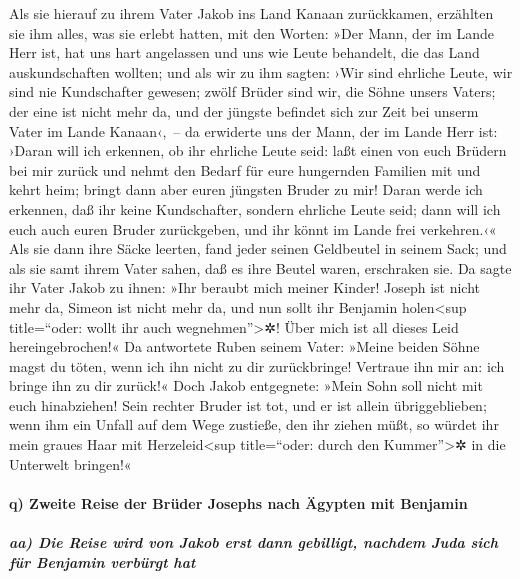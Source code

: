  Als sie hierauf zu ihrem Vater Jakob ins Land Kanaan
zurückkamen, erzählten sie ihm alles, was sie erlebt hatten, mit den
Worten:  »Der Mann, der im Lande Herr ist, hat uns hart
angelassen und uns wie Leute behandelt, die das Land auskundschaften
wollten;  und als wir zu ihm sagten: ›Wir sind ehrliche
Leute, wir sind nie Kundschafter gewesen;  zwölf Brüder
sind wir, die Söhne unsers Vaters; der eine ist nicht mehr da, und der
jüngste befindet sich zur Zeit bei unserm Vater im Lande Kanaan‹,~--
 da erwiderte uns der Mann, der im Lande Herr ist: ›Daran
will ich erkennen, ob ihr ehrliche Leute seid: laßt einen von euch
Brüdern bei mir zurück und nehmt den Bedarf für eure hungernden Familien
mit und kehrt heim;  bringt dann aber euren jüngsten
Bruder zu mir! Daran werde ich erkennen, daß ihr keine Kundschafter,
sondern ehrliche Leute seid; dann will ich euch auch euren Bruder
zurückgeben, und ihr könnt im Lande frei verkehren.‹« 
Als sie dann ihre Säcke leerten, fand jeder seinen Geldbeutel in seinem
Sack; und als sie samt ihrem Vater sahen, daß es ihre Beutel waren,
erschraken sie.  Da sagte ihr Vater Jakob zu ihnen: »Ihr
beraubt mich meiner Kinder! Joseph ist nicht mehr da, Simeon ist nicht
mehr da, und nun sollt ihr Benjamin holen\textless sup title=``oder:
wollt ihr auch wegnehmen''\textgreater✲! Über mich ist all dieses Leid
hereingebrochen!«  Da antwortete Ruben seinem Vater:
»Meine beiden Söhne magst du töten, wenn ich ihn nicht zu dir
zurückbringe! Vertraue ihn mir an: ich bringe ihn zu dir zurück!«
 Doch Jakob entgegnete: »Mein Sohn soll nicht mit euch
hinabziehen! Sein rechter Bruder ist tot, und er ist allein
übriggeblieben; wenn ihm ein Unfall auf dem Wege zustieße, den ihr
ziehen müßt, so würdet ihr mein graues Haar mit Herzeleid\textless sup
title=``oder: durch den Kummer''\textgreater✲ in die Unterwelt bringen!«

\hypertarget{q-zweite-reise-der-bruxfcder-josephs-nach-uxe4gypten-mit-benjamin}{%
\paragraph{q) Zweite Reise der Brüder Josephs nach Ägypten mit
Benjamin}\label{q-zweite-reise-der-bruxfcder-josephs-nach-uxe4gypten-mit-benjamin}}

\hypertarget{aa-die-reise-wird-von-jakob-erst-dann-gebilligt-nachdem-juda-sich-fuxfcr-benjamin-verbuxfcrgt-hat}{%
\subparagraph{aa) Die Reise wird von Jakob erst dann gebilligt, nachdem
Juda sich für Benjamin verbürgt
hat}\label{aa-die-reise-wird-von-jakob-erst-dann-gebilligt-nachdem-juda-sich-fuxfcr-benjamin-verbuxfcrgt-hat}}

